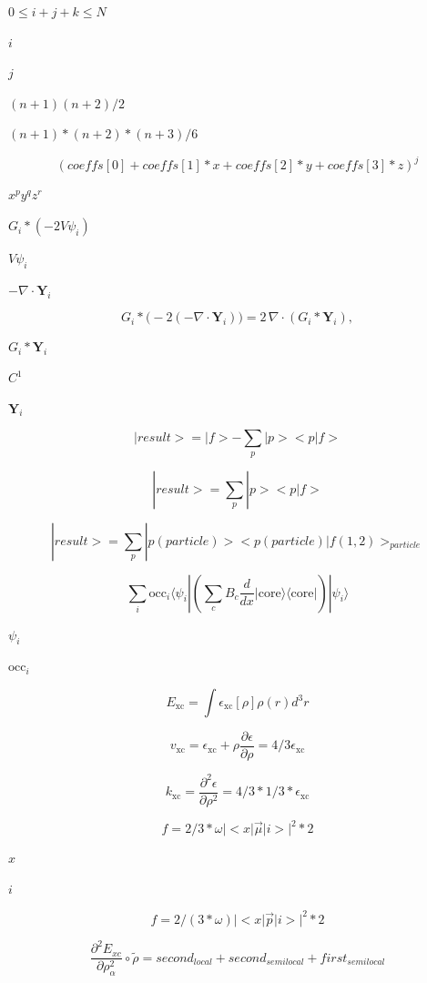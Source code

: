 \documentclass{article}
\begin{document}
$0\le i+j+k\le N$
\pagebreak

$i$
\pagebreak

$j$
\pagebreak

$(n+1)(n+2)/2$
\pagebreak

$(n+1)*(n+2)*(n+3)/6$
\pagebreak

\[ (coeffs[0] + coeffs[1]*x + coeffs[2]*y + coeffs[3]*z)^j \]
\pagebreak

$x^p y^q z^r$
\pagebreak

$ G_i*(-2 V\psi_i) $
\pagebreak

$ V\psi_i $
\pagebreak

$ -\nabla\cdot\mathbf Y_i $
\pagebreak

\[  G_i*\bigl(-2(-\nabla\cdot\mathbf Y_i)\bigr) = 2\,\nabla\cdot(G_i*\mathbf Y_i),
\]
\pagebreak

$ G_i*\mathbf Y_i $
\pagebreak

$ C^1 $
\pagebreak

$ \mathbf Y_i $
\pagebreak

\[  |result> = |f> - \sum_p |p><p|f>
\]
\pagebreak

\[    | result > =  \sum_p | p > <p|f>
\]
\pagebreak

\[|result> = \sum_p |p(particle)> <p(particle)|f(1,2)>_{particle}
\]
\pagebreak

\[\sum_i \mathrm{occ}_i \langle \psi_i | \left( \sum_c B_c \frac{d}{dx} | \mathrm{core} \rangle \langle \mathrm{core} | \right) | \psi_i \rangle
\]
\pagebreak

$ \psi_i $
\pagebreak

$ \mathrm{occ}_i $
\pagebreak

\[   E_\mathrm{xc} = \int\epsilon_\mathrm{xc}[\rho]\rho(r) d^3r
\]
\pagebreak

\[   v_\mathrm{xc} = \epsilon_\mathrm{xc} + \rho\frac{\partial \epsilon}{\partial \rho}
                 = 4/3\epsilon_\mathrm{xc}
\]
\pagebreak

\[   k_\mathrm{xc} = \frac{\partial^2\epsilon}{\partial \rho^2} = 4/3*1/3 * \epsilon_\mathrm{xc}
\]
\pagebreak

\[f = 2/3 * \omega |<x | \vec \mu | i >| ^2 * 2
\]
\pagebreak

$ x $
\pagebreak

$ i $
\pagebreak

\[f = 2/(3 * \omega) |<x | \vec p | i >| ^2 * 2
\]
\pagebreak

\[  \frac{\partial^2E_{xc}}{\partial \rho_\alpha^2}\circ\tilde\rho
     = second_{local} + second_{semilocal} + first_{semilocal}
\]
\pagebreak
\end{document}

